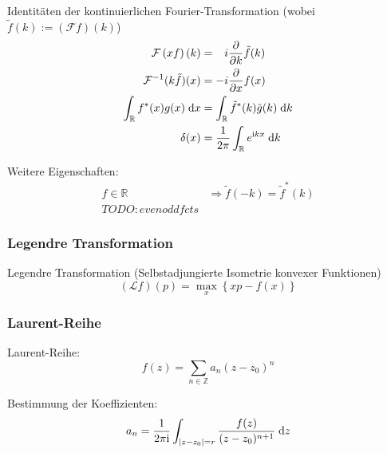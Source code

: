 \documentclass[11pt]{article}
\numberwithin{equation}{section}
\begin{document}
				\noindent
				Identitäten der kontinuierlichen Fourier-Transformation (wobei $\tilde{f}(k) := \left(\mathcal{F}f\right)(k)$)
				\begin{equation}
					\begin{aligned}
						\mathcal{F}\left(xf\right)(k) &= \phantom{-}i \frac{\partial }{\partial k}\tilde{f}(k) \\
						\mathcal{F}^{-1}(k\tilde{f})(x) &= -i\frac{\partial }{\partial x}f(x) \\
						\int_{\mathbb{R}} f^{*}(x) g(x)\;\mathrm{d} x &=
						\int_{\mathbb{R}}\tilde{f}^{*}(k)\tilde{g}(k)\;\mathrm{d} k \\
						\delta(x) &= \frac{1}{2\pi}\int_{\mathbb{R}}e^{\mathrm{i} kx}\;\mathrm{d} k \\
						\label{eq:fourierIdentities}
					\end{aligned}
				\end{equation}

				\noindent
				Weitere Eigenschaften:
				\begin{equation}
					\begin{aligned}
						f\in\mathbb{R}
						&\Rightarrow \tilde{f}(-k)=\tilde{f}^*(k) \\
						TODO: even odd fcts
					\end{aligned}
				\end{equation}

			\subsubsection{Legendre Transformation}
				\noindent
				Legendre Transformation (Selbstadjungierte Isometrie konvexer Funktionen)
				\begin{equation}
					(\mathcal{L}f)(p)=\max_x\left\lbrace xp-f(x) \right\rbrace
				\end{equation}


			\subsubsection{Laurent-Reihe}
				\noindent
				Laurent-Reihe:
				\begin{equation}
					f(z)=\sum_{n\in\mathbb{Z}} a_n(z-z_0)^n
				\end{equation}

				\noindent
				Bestimmung der Koeffizienten:
				\begin{equation}
					a_n = \frac{1}{2 \pi \mathrm{i}}\int_{\left| z-z_0 \right| = r} \frac{f(z)}{(z-z_0)^{n+1}}\;\mathrm{d} z
				\end{equation}
\end{document}
